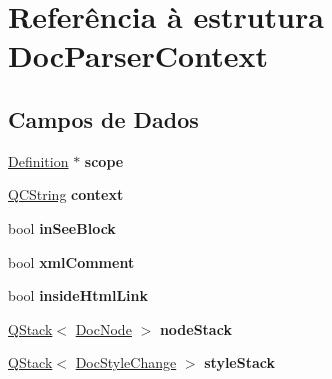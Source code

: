 \hypertarget{struct_doc_parser_context}{\section{Referência à estrutura Doc\-Parser\-Context}
\label{struct_doc_parser_context}
}
\subsection*{Campos de Dados}
\begin{DoxyCompactItemize}
\item 
\hypertarget{struct_doc_parser_context_a0641da13746785310e209e397df50342}{\hyperlink{class_definition}{Definition} $\ast$ {\bfseries scope}}\label{struct_doc_parser_context_a0641da13746785310e209e397df50342}

\item 
\hypertarget{struct_doc_parser_context_a62c191b491f85b6b360c82e5dccfcc78}{\hyperlink{class_q_c_string}{Q\-C\-String} {\bfseries context}}\label{struct_doc_parser_context_a62c191b491f85b6b360c82e5dccfcc78}

\item 
\hypertarget{struct_doc_parser_context_a15f29895c5238bd2a169d4de3a3be3a6}{bool {\bfseries in\-See\-Block}}\label{struct_doc_parser_context_a15f29895c5238bd2a169d4de3a3be3a6}

\item 
\hypertarget{struct_doc_parser_context_a5b2e079854f155adaa9d6fc7d54ef273}{bool {\bfseries xml\-Comment}}\label{struct_doc_parser_context_a5b2e079854f155adaa9d6fc7d54ef273}

\item 
\hypertarget{struct_doc_parser_context_abbbd9d6d1f8ef50c02d6b9af04224730}{bool {\bfseries inside\-Html\-Link}}\label{struct_doc_parser_context_abbbd9d6d1f8ef50c02d6b9af04224730}

\item 
\hypertarget{struct_doc_parser_context_a304a9e839974dc889cd5dc0cf3452bee}{\hyperlink{class_q_stack}{Q\-Stack}$<$ \hyperlink{class_doc_node}{Doc\-Node} $>$ {\bfseries node\-Stack}}\label{struct_doc_parser_context_a304a9e839974dc889cd5dc0cf3452bee}

\item 
\hypertarget{struct_doc_parser_context_a5805827e620773617e44c7e046e4c8a7}{\hyperlink{class_q_stack}{Q\-Stack}$<$ \hyperlink{class_doc_style_change}{Doc\-Style\-Change} $>$ {\bfseries style\-Stack}}\label{struct_doc_parser_context_a5805827e620773617e44c7e046e4c8a7}


\end{DoxyCompactItemize}
